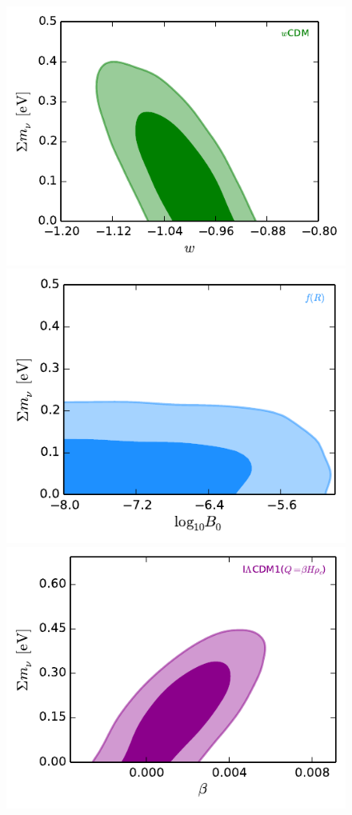 \documentclass[aps,prd,nofootinbib,amsmath,amssymb,twocolumn,superscriptaddress,10pt]{revtex4}%
\begin{document}
\begin{figure}
\begin{center}
\includegraphics[scale=0.6, angle=0]{w-mnu.pdf}
\includegraphics[scale=0.6, angle=0]{B0-mnu.pdf}\\
\includegraphics[scale=0.6, angle=0]{idebeta1-mnu.pdf}

\end{center}
\end{figure}
\end{document}
